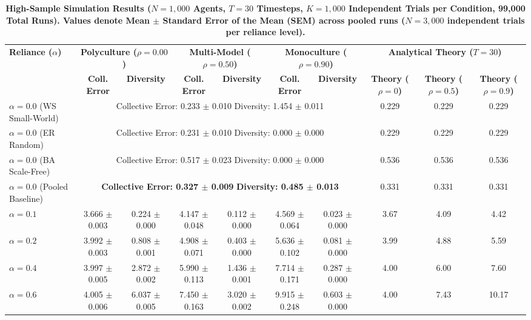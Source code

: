 \begin{table}[t]
\centering
\small
\setlength{\tabcolsep}{2.8pt}
\caption{\textbf{High-Sample Simulation Results ($N = 1,000$ Agents, $T = 30$ Timesteps, $K = 1,000$ Independent Trials per Condition, 99,000 Total Runs). Values denote Mean $\pm$ Standard Error of the Mean (SEM) across pooled runs ($N = 3,000$ independent trials per reliance level).}}
\begin{tabular}{@{}lccccccccc@{}}
\toprule
\textbf{Reliance ($\alpha$)} & \multicolumn{2}{c}{\textbf{Polyculture ($\rho = 0.00$)}} & \multicolumn{2}{c}{\textbf{Multi-Model ($\rho = 0.50$)}} & \multicolumn{2}{c}{\textbf{Monoculture ($\rho = 0.90$)}} & \multicolumn{3}{c}{\textbf{Analytical Theory ($T=30$)}} \\
\cmidrule(lr){2-3} \cmidrule(lr){4-5} \cmidrule(lr){6-7} \cmidrule(lr){8-10}
& \textbf{Coll. Error} & \textbf{Diversity} & \textbf{Coll. Error} & \textbf{Diversity} & \textbf{Coll. Error} & \textbf{Diversity} & \textbf{Theory ($\rho=0$)} & \textbf{Theory ($\rho=0.5$)} & \textbf{Theory ($\rho=0.9$)} \\
\midrule
$\alpha = 0.0$ (WS Small-World) & \multicolumn{6}{c}{Collective Error: 0.233 $\pm$ 0.010 \quad \vline \quad Diversity: 1.454 $\pm$ 0.011} & 0.229 & 0.229 & 0.229 \\
$\alpha = 0.0$ (ER Random)      & \multicolumn{6}{c}{Collective Error: 0.231 $\pm$ 0.010 \quad \vline \quad Diversity: 0.000 $\pm$ 0.000} & 0.229 & 0.229 & 0.229 \\
$\alpha = 0.0$ (BA Scale-Free)  & \multicolumn{6}{c}{Collective Error: 0.517 $\pm$ 0.023 \quad \vline \quad Diversity: 0.000 $\pm$ 0.000} & 0.536 & 0.536 & 0.536 \\
$\alpha = 0.0$ (Pooled Baseline)& \multicolumn{6}{c}{\textbf{Collective Error: 0.327 $\pm$ 0.009} \quad \vline \quad \textbf{Diversity: 0.485 $\pm$ 0.013}} & 0.331 & 0.331 & 0.331 \\
\midrule
$\alpha = 0.1$ & 3.666 $\pm$ 0.003 & 0.224 $\pm$ 0.000 & 4.147 $\pm$ 0.048 & 0.112 $\pm$ 0.000 & 4.569 $\pm$ 0.064 & 0.023 $\pm$ 0.000 & 3.67 & 4.09 & 4.42 \\
$\alpha = 0.2$ & 3.992 $\pm$ 0.003 & 0.808 $\pm$ 0.001 & 4.908 $\pm$ 0.071 & 0.403 $\pm$ 0.000 & 5.636 $\pm$ 0.102 & 0.081 $\pm$ 0.000 & 3.99 & 4.88 & 5.59 \\
$\alpha = 0.4$ & 3.997 $\pm$ 0.005 & 2.872 $\pm$ 0.002 & 5.990 $\pm$ 0.113 & 1.436 $\pm$ 0.001 & 7.714 $\pm$ 0.171 & 0.287 $\pm$ 0.000 & 4.00 & 6.00 & 7.60 \\
$\alpha = 0.6$ & 4.005 $\pm$ 0.006 & 6.037 $\pm$ 0.005 & 7.450 $\pm$ 0.163 & 3.020 $\pm$ 0.002 & 9.915 $\pm$ 0.248 & 0.603 $\pm$ 0.000 & 4.00 & 7.43 & 10.17 \\

\end{tabular}
\end{table}
